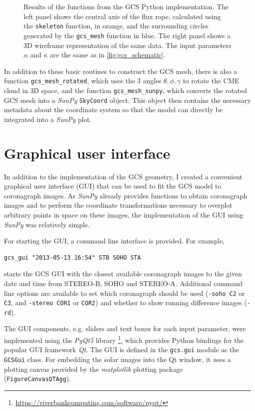 \begin{figure}
	\centering
	
	\caption[Results of the functions from the GCS Python implementation.]{Results of the functions from the GCS Python implementation. The left panel shows the central axis of the flux rope, calculated using the \texttt{skeleton} function, in orange, and the surrounding circles generated by the \texttt{gcs\_mesh} function in blue. The right panel shows a 3D wireframe representation of the same data. The input parameters $\alpha$ and $\kappa$ are the same as in \autoref{fig:gcs_schematic}.}
	\label{fig:gcs_geometry}
\end{figure}

In addition to these basic routines to construct the GCS mesh, there is also a function \verb|gcs_mesh_rotated|, which uses the 3 angles $\theta, \phi, \gamma$ to rotate the CME cloud in 3D space, and the function \verb|gcs_mesh_sunpy|, which converts the rotated GCS mesh into a \textit{SunPy} \texttt{SkyCoord} object. This object then contains the necessary metadata about the coordinate system so that the model can directly be integrated into a \textit{SunPy} plot.

\section{Graphical user interface}

In addition to the implementation of the GCS geometry, I created a convenient graphical user interface (GUI) that can be used to fit the GCS model to coronagraph images. As \textit{SunPy} already provides functions to obtain coronagraph images and to perform the coordinate transformations necessary to overplot arbitrary points in space on these images, the implementation of the GUI using \textit{SunPy} was relatively simple.

For starting the GUI, a command line interface is provided. For example,
\begin{verbatim}
gcs_gui "2013-05-13 16:54" STB SOHO STA
\end{verbatim}
starts the GCS GUI with the closest available coronagraph images to the given date and time from STEREO-B, SOHO and STEREO-A. Additional command line options are available to set which coronagraph should be used (\texttt{-soho C2} or \texttt{C3}, and \texttt{-stereo COR1} or \texttt{COR2}) and whether to show running difference images (\texttt{-rd}).

The GUI components, e.g. sliders and text boxes for each input parameter, were implemented using the \textit{PyQt5} library \footnote{\url{https://riverbankcomputing.com/software/pyqt/}}, which provides Python bindings for the popular GUI framework \textit{Qt}. The GUI is defined in the \texttt{gcs.gui} module as the \texttt{GCSGui} class. For embedding the solar images into the Qt window, it uses a plotting canvas provided by the \textit{matplotlib} plotting package (\texttt{FigureCanvasQTAgg}).

